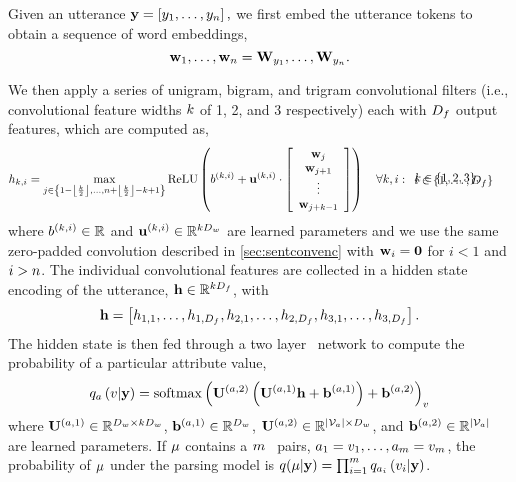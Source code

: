 Given an utterance $\mathbf{y} = \left[y_1,\ldots,y_n\right],$
we first embed the utterance tokens to obtain a sequence of word embeddings, \[
\mathbf{w}_1, \ldots, \mathbf{w}_n = \mathbf{W}_{y_1}, \ldots,
\mathbf{W}_{y_n}. \]

We then apply a series of unigram, bigram, and trigram convolutional filters
(i.e., convolutional feature widths ${k}$ of 1, 2, and 3 respectively)
each with $D_f$ output features, which are computed as,
\begin{align*} {h}_{k,i} & = 
    \max_{j \in \left\{ 1 - \left\lfloor \frac{{k}}{2} \right\rfloor, \ldots, n + \left\lfloor \frac{{k}}{2} \right\rfloor - {k} + 1 \right\} } 
    \operatorname{ReLU}\left({b^{(k,i)}} + {\mathbf{u}^{(k,i)}} \cdot
\left[\begin{array}{c} \mathbf{w}_j \\ \mathbf{w}_{j+1}\\\vdots \\\mathbf{w}_{j+k-1} \end{array}  \right]\right)  \quad \forall k,i: \begin{array}{l} k \in \{1,2,3\}, \\[-1em] i \in \{1,\ldots, D_f\} \end{array}
\end{align*}
where ${b^{(k,i)}} \in \mathbb{R}$ and ${\mathbf{u}^{(k,i)}} \in
\mathbb{R}^{{k}D_w}$ are learned parameters and we use the same
zero-padded convolution described in \autoref{sec:sentconvenc} with $\mathbf{w}_i
= \mathbf{0}$ for $i < 1$ and $i > n$.  The individual convolutional
features are collected in a hidden state encoding of the utterance, $\mathbf{h}
\in \mathbb{R}^{{k} D_f}$, with
\[
\mathbf{h} = \left[{h}_{1,1},\ldots,{h}_{1,D_f},{h}_{2,1},\ldots,{h}_{2,D_f}, {h}_{3,1}, \ldots, {h}_{3,D_f}\right].
\] 
The hidden state is then fed through a two layer \feedforward~network to
compute the probability of a particular attribute value,
\[    
q_{a}\left(v|\mathbf{y}\right)   = \operatorname*{softmax}\left({\mathbf{U}^{(a,2)}} \left( {\mathbf{U}^{(a,1)}} \mathbf{h} + {\mathbf{b}^{(a,1)}}\right)   + {\mathbf{b}^{(a,2)}} \right)_{v}
\]
where ${\mathbf{U}^{(a,1)}} \in \mathbb{R}^{D_w \times
{k}D_w}$, ${\mathbf{b}^{(a,1)}} \in \mathbb{R}^{D_w}$,
${\mathbf{U}^{(a,2)}} \in \mathbb{R}^{{\left\vert {\mathcal{V}_{\ensuremath{a}}} \right\vert} \times D_w}$, and
${\mathbf{b}^{(a,2)}} \in \mathbb{R}^{{\left\vert {\mathcal{V}_{\ensuremath{a}}} \right\vert}}$ are learned parameters. If
$\mu$ contains a $m$ \attributevalue~pairs,
$a_1=v_1,\ldots,a_{m}=v_{m}$, the probability of $\mu$
under the parsing model is $q(\mu|\mathbf{y}) = \prod_{i=1}^{m}
q_{a_i}\left(v_i|\mathbf{y} \right)$.

